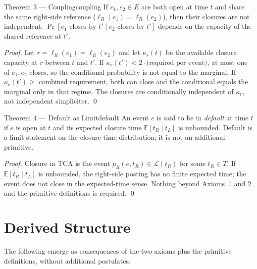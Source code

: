 \documentclass[11pt]{article}
\begin{document}
\begin{theoremBOX}{Theorem 3 --- Coupling}{coupling}
If $e_1, e_2 \in E$ are both open at time $t$ and share the same right-side reference ($\ell_R(e_1) = \ell_R(e_2)$), then their closures are not independent: $\Pr[e_1 \text{ closes by } t' \mid e_2 \text{ closes by } t']$ depends on the capacity of the shared reference at $t'$.
\end{theoremBOX}

\begin{proof}
Let $r = \ell_R(e_1) = \ell_R(e_2)$ and let $\kappa_r(t)$ be the available closure capacity at $r$ between $t$ and $t'$. If $\kappa_r(t') < 2 \cdot \text{(required per event)}$, at most one of $e_1, e_2$ closes, so the conditional probability is not equal to the marginal. If $\kappa_r(t') \geq $ combined requirement, both can close and the conditional equals the marginal only in that regime. The closures are conditionally independent of $\kappa_r$, not independent simpliciter. \qed
\end{proof}

\begin{theoremBOX}{Theorem 4 --- Default as Limit}{default}
An event $e$ is said to be in \emph{default} at time $t$ if $e$ is open at $t$ and its expected closure time $\mathbb{E}[t_R \mid t_L]$ is unbounded. Default is a limit statement on the closure-time distribution; it is not an additional primitive.
\end{theoremBOX}

\begin{proof}
Closure in TCA is the event $p_R(e, t_R) \in \mathcal{L}(t_R)$ for some $t_R \in T$. If $\mathbb{E}[t_R \mid t_L]$ is unbounded, the right-side posting has no finite expected time; the event does not close in the expected-time sense. Nothing beyond Axioms~1 and 2 and the primitive definitions is required. \qed
\end{proof}

\section{Derived Structure}

The following emerge as consequences of the two axioms plus the primitive definitions, without additional postulates.
\end{document}
